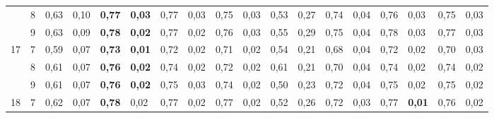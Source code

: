 \documentclass[conference]{IEEEtran}
\begin{document}
\begin{table}[]
\begin{tabular}{|cl|ll|ll|ll|ll|ll|ll|ll|ll|}
		\multicolumn{1}{|c|}{}                    & 8 & \multicolumn{1}{l|}{0,63} & 0,10          & \multicolumn{1}{l|}{\textbf{0,77}} & \textbf{0,03} & \multicolumn{1}{l|}{0,77}          & 0,03 & \multicolumn{1}{l|}{0,75}          & 0,03 & \multicolumn{1}{l|}{0,53}                 & 0,27 & \multicolumn{1}{l|}{0,74} & 0,04 & \multicolumn{1}{l|}{0,76}          & 0,03          & \multicolumn{1}{l|}{0,75}          & 0,03          \\ \cline{2-18} 
		\multicolumn{1}{|c|}{}                    & 9 & \multicolumn{1}{l|}{0,63} & 0,09          & \multicolumn{1}{l|}{\textbf{0,78}} & \textbf{0,02} & \multicolumn{1}{l|}{0,77}          & 0,02 & \multicolumn{1}{l|}{0,76}          & 0,03 & \multicolumn{1}{l|}{0,55}                 & 0,29 & \multicolumn{1}{l|}{0,75} & 0,04 & \multicolumn{1}{l|}{0,78}          & 0,03          & \multicolumn{1}{l|}{0,77}          & 0,03          \\ \hline
		\multicolumn{1}{|c|}{\multirow{3}{*}{17}} & 7 & \multicolumn{1}{l|}{0,59} & 0,07          & \multicolumn{1}{l|}{\textbf{0,73}} & \textbf{0,01} & \multicolumn{1}{l|}{0,72}          & 0,02 & \multicolumn{1}{l|}{0,71}          & 0,02 & \multicolumn{1}{l|}{0,54}                 & 0,21 & \multicolumn{1}{l|}{0,68} & 0,04 & \multicolumn{1}{l|}{0,72}          & 0,02          & \multicolumn{1}{l|}{0,70}          & 0,03          \\ \cline{2-18} 
		\multicolumn{1}{|c|}{}                    & 8 & \multicolumn{1}{l|}{0,61} & 0,07          & \multicolumn{1}{l|}{\textbf{0,76}} & \textbf{0,02} & \multicolumn{1}{l|}{0,74}          & 0,02 & \multicolumn{1}{l|}{0,72}          & 0,02 & \multicolumn{1}{l|}{0,61}                 & 0,21 & \multicolumn{1}{l|}{0,70} & 0,04 & \multicolumn{1}{l|}{0,74}          & 0,02          & \multicolumn{1}{l|}{0,74}          & 0,02          \\ \cline{2-18} 
		\multicolumn{1}{|c|}{}                    & 9 & \multicolumn{1}{l|}{0,61} & 0,07          & \multicolumn{1}{l|}{\textbf{0,76}} & \textbf{0,02} & \multicolumn{1}{l|}{0,75}          & 0,03 & \multicolumn{1}{l|}{0,74}          & 0,02 & \multicolumn{1}{l|}{0,50}                 & 0,23 & \multicolumn{1}{l|}{0,72} & 0,04 & \multicolumn{1}{l|}{0,75}          & 0,02          & \multicolumn{1}{l|}{0,75}          & 0,02          \\ \hline
		\multicolumn{1}{|c|}{\multirow{3}{*}{18}} & 7 & \multicolumn{1}{l|}{0,62} & 0,07          & \multicolumn{1}{l|}{\textbf{0,78}} & 0,02          & \multicolumn{1}{l|}{0,77}          & 0,02 & \multicolumn{1}{l|}{0,77}          & 0,02 & \multicolumn{1}{l|}{0,52}                 & 0,26 & \multicolumn{1}{l|}{0,72} & 0,03 & \multicolumn{1}{l|}{0,77}          & \textbf{0,01} & \multicolumn{1}{l|}{0,76}          & 0,02          \\ \cline{2-18} 

\end{tabular}
\end{table}
\end{document}
